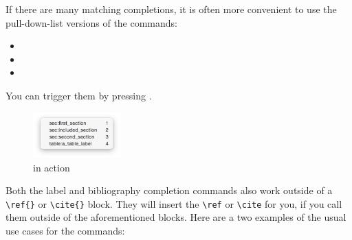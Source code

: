 \documentclass[11pt, x11names]{article}
\begin{document}
If there are many matching completions, it is often more convenient to use the pull-down-list versions of the commands:

\begin{itemize}
    \item {}
    \item {}
    \item {}
\end{itemize}

You can trigger them by pressing \keys{\Alt + \esc}.

\begin{figure}[h]
  \centering
    \includegraphics[width=0.3\textwidth]{Figures/Label Completion}
  \caption{ in action}
  \label{fig:Figures_Label_Completion}
\end{figure}

Both the label and bibliography completion commands also work outside of a \texttt{\textbackslash{}ref\{\}} or \texttt{\textbackslash{}cite\{\}} block. They will insert the \texttt{\textbackslash{}ref} or \texttt{\textbackslash{}cite} for you, if you call them outside of the aforementioned blocks. Here are a two examples of the usual use cases for the commands:
\end{document}
